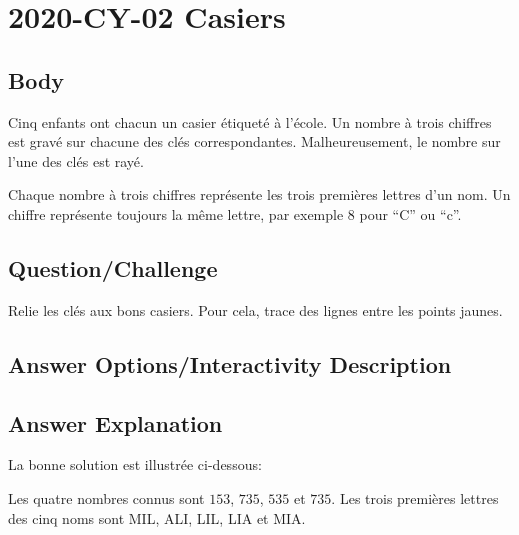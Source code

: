 \documentclass[a4paper,11pt]{report}
\newcommand{\taskGraphicsFolder}{..}
\begin{document}
\section*{\centering{} 2020-CY-02 Casiers}


\subsection*{Body}

Cinq enfants ont chacun un casier étiqueté à l’école. Un nombre à trois chiffres est gravé sur chacune des clés correspondantes. Malheureusement, le nombre sur l’une des clés est rayé.

Chaque nombre à trois chiffres représente les trois premières lettres d’un nom. Un chiffre représente toujours la même lettre, par exemple $8$ pour “C” ou “c”.

{\em

\subsection*{Question/Challenge}

Relie les clés aux bons casiers. Pour cela, trace des lignes entre les points jaunes.

{\centering%
\par}

}\begingroup
\renewcommand{\arraystretch}{1.5}
\subsection*{Answer Options/Interactivity Description}



\endgroup

\subsection*{Answer Explanation}

La bonne solution est illustrée ci-dessous:

{\centering%
\par}

Les quatre nombres connus sont $153$, $735$, $535$ et $735$. Les trois premières lettres des cinq noms sont MIL, ALI, LIL, LIA et MIA.
\end{document}
